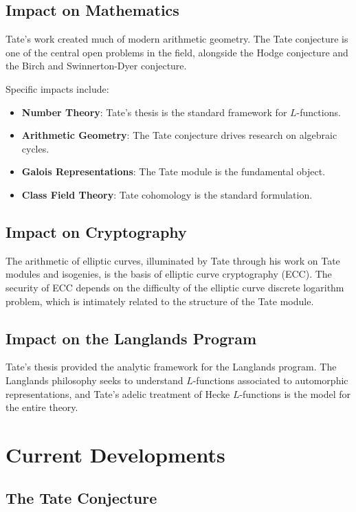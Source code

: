 \subsection{Impact on Mathematics}
Tate's work created much of modern arithmetic geometry. The Tate conjecture is one of the central open problems in the field, alongside the Hodge conjecture and the Birch and Swinnerton-Dyer conjecture.

Specific impacts include:
\begin{itemize}
\item \textbf{Number Theory}: Tate's thesis is the standard framework for $L$-functions.
\item \textbf{Arithmetic Geometry}: The Tate conjecture drives research on algebraic cycles.
\item \textbf{Galois Representations}: The Tate module is the fundamental object.
\item \textbf{Class Field Theory}: Tate cohomology is the standard formulation.
\end{itemize}

\subsection{Impact on Cryptography}
The arithmetic of elliptic curves, illuminated by Tate through his work on Tate modules and isogenies, is the basis of elliptic curve cryptography (ECC). The security of ECC depends on the difficulty of the elliptic curve discrete logarithm problem, which is intimately related to the structure of the Tate module.

\subsection{Impact on the Langlands Program}
Tate's thesis provided the analytic framework for the Langlands program. The Langlands philosophy seeks to understand $L$-functions associated to automorphic representations, and Tate's adelic treatment of Hecke $L$-functions is the model for the entire theory.

\section{Current Developments}

\subsection{The Tate Conjecture}


